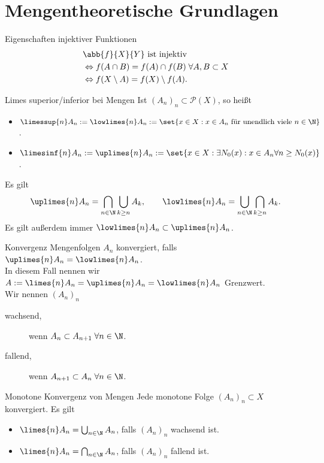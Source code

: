 \section*{Mengentheoretische Grundlagen}

\begin{karte}{Eigenschaften injektiver Funktionen}
    \begin{align*}
    	&\abb{f}{X}{Y} \text{ ist injektiv } \\
    	&\Leftrightarrow f(A \cap B) = f(A) \cap f(B) \;\forall A, B \subset X \\
	   	&\Leftrightarrow f(X \setminus A) = f(X) \setminus f(A).
    \end{align*}
\end{karte}

\begin{karte}{Limes superior/inferior bei Mengen}
	Ist \((A_n)_n \subset \mathcal{P}(X) \), so heißt 
	\begin{itemize}
		\item \( \limessup{n} A_n := \lowlimes{n} A_n := \set{ x \in X: x \in A_n 
			\text{ für unendlich viele } n\in\N } \).
		\item \( \limesinf{n} A_n := \uplimes{n} A_n := \set{ x \in X: \exists N_0(x): x \in A_n 
			\forall n \geq N_0(x) } \).
	\end{itemize}
	Es gilt
	\[ \uplimes{n} A_n = \bigcap_{n\in\N} \bigcup_{k \geq n}A_k, 
	\qquad \lowlimes{n} A_n = \bigcup_{n\in\N} \bigcap_{k\geq n} A_k. \]
	Es gilt außerdem immer \(\lowlimes{n} A_n \subset \uplimes{n} A_n \).
\end{karte}

\begin{karte}{Konvergenz Mengenfolgen}
	\(A_n\) konvergiert, falls \(\uplimes{n} A_n = \lowlimes{n} A_n\). \\
	In diesem Fall nennen wir \(A := \limes{n} A_n = \uplimes{n} A_n = \lowlimes{n} A_n \) Grenzwert.\\
	Wir nennen \((A_n)_n\) 
	\begin{description}
		\item[wachsend,] wenn \( A_n \subset A_{n+1} \;\forall n \in \N \).
		\item[fallend,] wenn \( A_{n+1} \subset A_n \;\forall n \in \N \).
	\end{description}
\end{karte}

\begin{karte}{Monotone Konvergenz von Mengen}
	Jede monotone Folge \( (A_n)_n \subset X \) konvergiert. Es gilt 
	\begin{itemize}
		\item \( \limes{n} A_n = \bigcup_{n\in\N} A_n \), falls \( (A_n)_n \) wachsend ist.
		\item \( \limes{n} A_n = \bigcap_{n\in\N} A_n \), falls \( (A_n)_n \) fallend ist.
	\end{itemize}
\end{karte}
